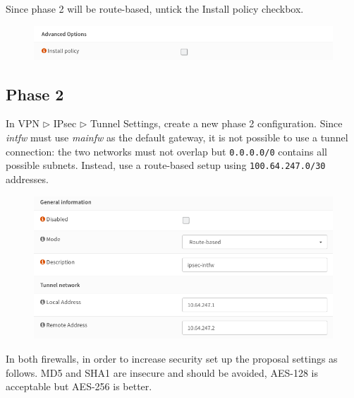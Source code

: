 \documentclass{homework}
\newcommand{\intfw}{\textit{intfw}\xspace}
\newcommand{\mainfw}{\textit{mainfw}\xspace}
\begin{document}
    \vspace{-10pt}
%
    Since phase 2 will be route-based, untick the Install policy checkbox.
    \vspace{-5pt}
    \begin{figure}[H]
        \centering
        \includegraphics[width=\linewidth]{ipsec/phase1-advanced}
        \label{fig:ipsec-phase1-advanced}
    \end{figure}
    
    \subsection{Phase 2}
    In VPN $\triangleright$ IPsec $\triangleright$ Tunnel Settings, create a new phase 2 configuration.
    Since \intfw must use \mainfw as the default gateway, it is not possible to use a tunnel connection: the two networks must not overlap but \texttt{0.0.0.0/0} contains all possible subnets.
    Instead, use a route-based setup using \texttt{100.64.247.0/30} addresses.
    \begin{figure}[H]
        \centering
        \includegraphics[width=\linewidth]{ipsec/phase2-general}
        \label{fig:ipsec-phase2-general}
    \end{figure}
%
    In both firewalls, in order to increase security set up the proposal settings as follows.
    MD5 and SHA1 are insecure and should be avoided, AES-128 is acceptable but AES-256 is better.
\end{document}
